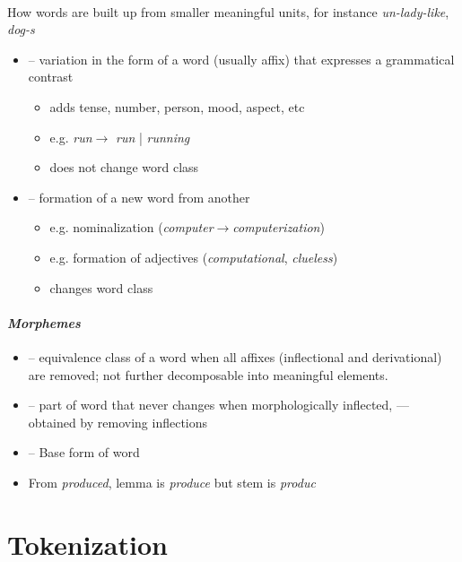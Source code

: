 \documentclass[10pt,twocolumn]{article}
\begin{document}
\paragraph{} How words are built up from smaller meaningful
units, for instance \textit{un-lady-like}, \textit{dog-s}
\begin{itemize}
\item \textbf{} -- variation in the form of a word (usually affix)
  that expresses a grammatical contrast
  \begin{itemize}
  \item adds tense, number, person, mood, aspect, etc
  \item e.g. \textit{run}$\rightarrow$ \textit{run} | \textit{running} 
  \item does not change word class
  \end{itemize}
\item \textbf{} -- formation of a new word from another
  \begin{itemize}
  \item e.g. nominalization (\textit{computer}$\rightarrow$\textit{computerization})
  \item e.g. formation of adjectives (\textit{computational}, \textit{clueless})
  \item changes word class
  \end{itemize}
\end{itemize}

\paragraph{\textit{Morphemes}}
\begin{itemize}
\item \textbf{} -- equivalence class of a word when all affixes (inflectional and derivational) are removed; not further decomposable into meaningful elements. 
\item \textbf{} -- part of word that never changes when
  morphologically inflected,  --- obtained by removing inflections
\item \textbf{} -- Base form of word
\item From \textit{produced}, lemma is \textit{produce} but stem is \textit{produc}
\end{itemize}


\section{Tokenization}
\end{document}
